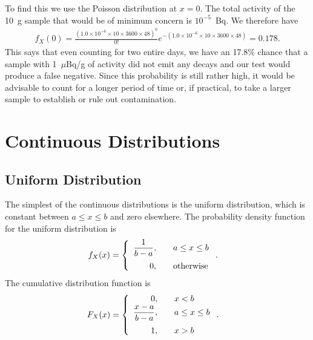 To find this we use the Poisson distribution at $x = 0$. The total activity of the 10~g sample that would be of minimum concern is $10^{-5}$~Bq. We therefore have
\begin{align}
  f_X(0) = \frac{( 1.0\times10^{-6} \times 10 \times 3600 \times 48)^0}{0!} e^{-( 1.0\times10^{-6} \times 10 \times 3600 \times 48)} = 0.178.
\end{align}
This says that even counting for two entire days, we have an 17.8\% chance that a sample with 1~$\mu$Bq/g of activity did not emit any decays and our test would produce a false negative. Since this probability is still rather high, it would be advisable to count for a longer period of time or, if practical, to take a larger sample to establish or rule out contamination. 



\section{Continuous Distributions}

\subsection{Uniform Distribution}

The simplest of the continuous distributions is the uniform distribution, which is constant between $a \le x \le b$ and zero elsewhere. The probability density function for the uniform distribution is
\begin{align}
  f_X(x) &= \left\{ \begin{array}{r l}
  \dfrac{1}{b-a}, & \quad a \le x \le b \vspace{0.2cm} \\
  0, & \quad \text{otherwise} \\ \end{array} \right. .
\end{align}
The cumulative distribution function is
\begin{align}
  F_X(x) &= \left\{ \begin{array}{r l}
  0, & \quad x < b \\ 
  \dfrac{x - a}{b-a}, & \quad a \le x \le b \vspace{0.2cm} \\
  1, & \quad x > b \\ \end{array} \right. .
\end{align}


